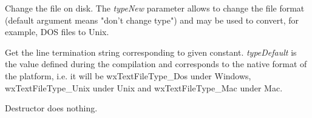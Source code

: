 Change the file on disk. The {\it typeNew} parameter allows to change the
file format (default argument means "don't change type") and may be used to
convert, for example, DOS files to Unix.

\label{wxtextfilegeteol}

Get the line termination string corresponding to given constant. {\it typeDefault} is
the value defined during the compilation and corresponds to the native format of the
platform, i.e. it will be wxTextFileType\_Dos under Windows, wxTextFileType\_Unix under
Unix and wxTextFileType\_Mac under Mac.

\label{wxtextfiledtor}

Destructor does nothing.
